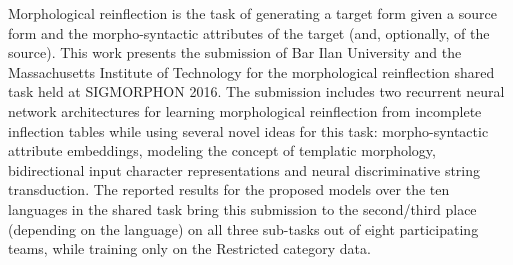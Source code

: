 Morphological reinflection is the task of generating a target form given a source form and the morpho-syntactic attributes of the target (and, optionally, of the source). This work presents the submission of Bar Ilan University and the Massachusetts Institute of Technology for the morphological reinflection shared task held at SIGMORPHON 2016. The submission includes two recurrent neural network architectures for learning morphological reinflection from incomplete inflection tables while using several novel ideas for this task: morpho-syntactic attribute embeddings, modeling the concept of templatic morphology, bidirectional input character representations and neural discriminative string transduction. The reported results for the proposed models over the ten languages in the shared task bring this submission to the second/third place (depending on the language) on all three sub-tasks out of eight participating teams, while training only on the Restricted category data.
